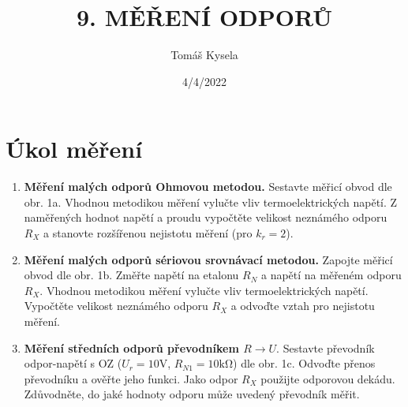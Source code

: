 \documentclass{article}
\title{\textbf{9. MĚŘENÍ ODPORŮ}}
\author{Tomáš Kysela}
\date{4/4/2022}
\begin{document}
\maketitle

\section{Úkol měření}
\begin{enumerate}
	\item \textbf{Měření malých odporů Ohmovou metodou.} Sestavte měřicí obvod dle obr. 1a. Vhodnou metodikou měření vylučte vliv termoelektrických napětí. Z naměřených hodnot napětí a proudu vypočtěte velikost neznámého odporu $R_X$ a stanovte rozšířenou nejistotu měření (pro $k_r = 2$).
	
	\item \textbf{Měření malých odporů sériovou srovnávací metodou.} Zapojte měřicí obvod dle obr. 1b. Změřte napětí na etalonu $R_N$ a napětí na měřeném odporu $R_X$. Vhodnou metodikou měření vylučte vliv termoelektrických napětí. Vypočtěte velikost neznámého odporu $R_X$ a odvoďte vztah pro nejistotu měření.
	
	\item \textbf{Měření středních odporů převodníkem $R \to U$}. Sestavte převodník odpor-napětí s OZ 
	($U_r = 10 \si{\volt}$, $R_{N1} = 10 \si{\kilo\ohm}$) dle obr. 1c. Odvoďte přenos převodníku a ověřte jeho funkci. Jako odpor $R_X$ použijte odporovou dekádu. Zdůvodněte, do jaké hodnoty odporu může uvedený převodník měřit. 
\end{enumerate}
\end{document}
